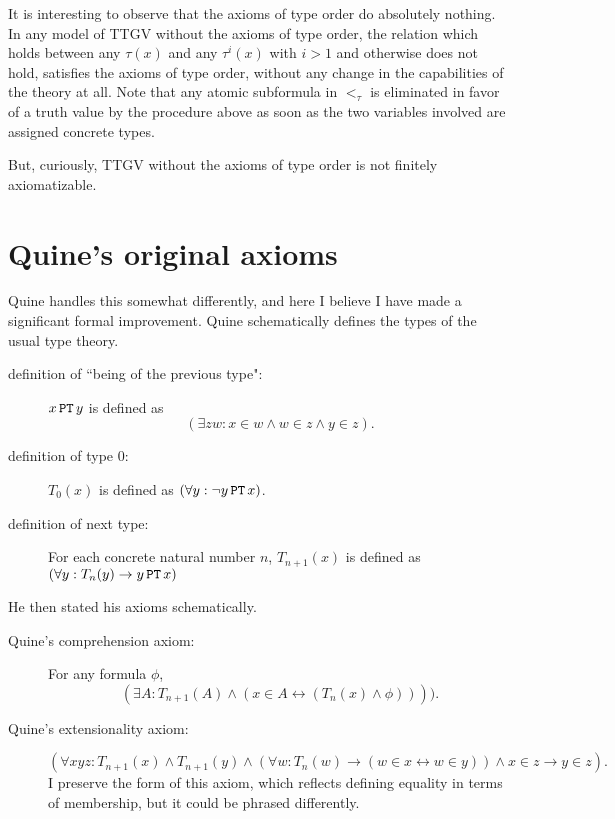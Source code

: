 \documentclass[12pt]{article}
\begin{document}
It is interesting to observe that the axioms of type order do absolutely nothing.  In any model of TTGV without the axioms of type order, the relation which holds between any $\tau(x)$ and any $\tau^i(x)$ with $i>1$ and otherwise does not hold, satisfies the axioms of type order, without any change in 
the capabilities of the theory at all.  Note that any atomic subformula in $<_\tau$ is eliminated in favor of a truth value by the procedure above as soon as the two variables involved are assigned concrete types.

But, curiously, TTGV without the axioms of type order is not finitely axiomatizable.





\section{Quine's original axioms}

Quine handles this somewhat differently, and here I believe I have made a significant formal improvement.  Quine schematically defines the types of the usual type theory.


\begin{description}

\item[definition of ``being of the previous type":]  $x\, {\tt PT}\, y$ is defined as $$(\exists zw: x \in w \wedge w \in z \wedge y \in z).$$

\item[definition of type 0:]  $T_0(x)$ is defined as $(\forall y: \neg y\, {\tt PT}\, x)$.

\item[definition of next type:]  For each concrete natural number $n$, $T_{n+1}(x)$ is
defined as $(\forall y:  T_n(y) \rightarrow y\, {\tt PT}\, x)$

\end{description}

He then stated his axioms schematically.


\begin{description}

\item[Quine's comprehension axiom:]  For any formula $\phi$, $$(\exists A:  T_{n+1}(A) \wedge (x\in A \leftrightarrow (T_n(x) \wedge  \phi)))).$$

\item[Quine's extensionality axiom:]  $$(\forall xyz:T_{n+1}(x) \wedge  T_{n+1}(y) \wedge (\forall w:T_n(w) \rightarrow (w \in x \leftrightarrow w \in y)) \wedge x \in z \rightarrow y \in z).$$  I preserve the form of this axiom, which reflects defining equality in terms of membership, but it could be phrased differently.

\end{description}
\end{document}
